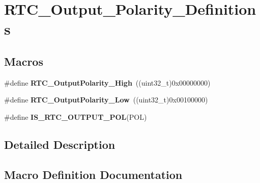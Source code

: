 \hypertarget{group___r_t_c___output___polarity___definitions}{}\section{R\+T\+C\+\_\+\+Output\+\_\+\+Polarity\+\_\+\+Definitions}
\label{group___r_t_c___output___polarity___definitions}
\subsection*{Macros}
\begin{DoxyCompactItemize}
\item 
\hypertarget{group___r_t_c___output___polarity___definitions_ga0c9b36bf812f02f67d82c02594cc93b3}{}\#define {\bfseries R\+T\+C\+\_\+\+Output\+Polarity\+\_\+\+High}~((uint32\+\_\+t)0x00000000)\label{group___r_t_c___output___polarity___definitions_ga0c9b36bf812f02f67d82c02594cc93b3}

\item 
\hypertarget{group___r_t_c___output___polarity___definitions_ga6900b0eb6f2e3abe65245c49661d55af}{}\#define {\bfseries R\+T\+C\+\_\+\+Output\+Polarity\+\_\+\+Low}~((uint32\+\_\+t)0x00100000)\label{group___r_t_c___output___polarity___definitions_ga6900b0eb6f2e3abe65245c49661d55af}

\item 
\#define {\bfseries I\+S\+\_\+\+R\+T\+C\+\_\+\+O\+U\+T\+P\+U\+T\+\_\+\+P\+O\+L}(P\+O\+L)
\end{DoxyCompactItemize}


\subsection{Detailed Description}


\subsection{Macro Definition Documentation}
\hypertarget{group___r_t_c___output___polarity___definitions_ga1bc0fee899de25a9c1bcbb6c2b21b35d}{}

